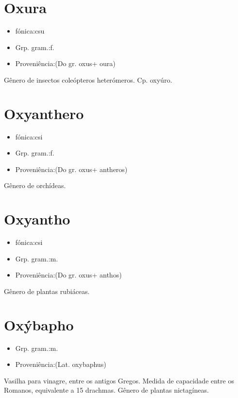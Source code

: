 \section{Oxura}
\begin{itemize}
\item {fónica:csu}
\end{itemize}
\begin{itemize}
\item {Grp. gram.:f.}
\end{itemize}
\begin{itemize}
\item {Proveniência:(Do gr. \textunderscore oxus\textunderscore  + \textunderscore oura\textunderscore )}
\end{itemize}
Gênero de insectos coleópteros heterómeros.
Cp. \textunderscore oxyúro\textunderscore .
\section{Oxyanthero}
\begin{itemize}
\item {fónica:csi}
\end{itemize}
\begin{itemize}
\item {Grp. gram.:f.}
\end{itemize}
\begin{itemize}
\item {Proveniência:(Do gr. \textunderscore oxus\textunderscore  + \textunderscore antheros\textunderscore )}
\end{itemize}
Gênero de orchídeas.
\section{Oxyantho}
\begin{itemize}
\item {fónica:csi}
\end{itemize}
\begin{itemize}
\item {Grp. gram.:m.}
\end{itemize}
\begin{itemize}
\item {Proveniência:(Do gr. \textunderscore oxus\textunderscore  + \textunderscore anthos\textunderscore )}
\end{itemize}
Gênero de plantas rubiáceas.
\section{Oxýbapho}
\begin{itemize}
\item {Grp. gram.:m.}
\end{itemize}
\begin{itemize}
\item {Proveniência:(Lat. \textunderscore oxybaphus\textunderscore )}
\end{itemize}
Vasilha para vinagre, entre os antigos Gregos.
Medida de capacidade entre os Romanos, equivalente a 15 drachmas.
Gênero de plantas nictagíneas.
